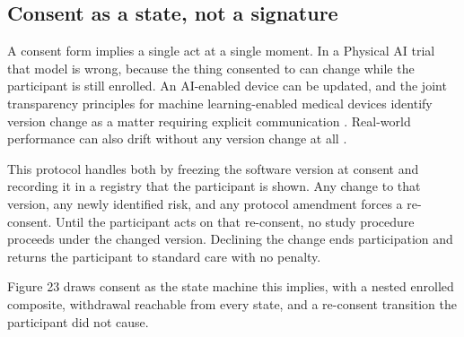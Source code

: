 \subsection{Consent as a state, not a signature}

A consent form implies a single act at a single moment. In a Physical AI trial
that model is wrong, because the thing consented to can change while the
participant is still enrolled. An AI-enabled device can be updated, and the
joint transparency principles for machine learning-enabled medical devices
identify version change as a matter requiring explicit communication
\cite{FDATrans2024}. Real-world performance can also drift without any version
change at all \cite{FDARealW2025}.

This protocol handles both by freezing the software version at consent and
recording it in a registry that the participant is shown. Any change to that
version, any newly identified risk, and any protocol amendment forces a
re-consent. Until the participant acts on that re-consent, no study procedure
proceeds under the changed version. Declining the change ends participation and
returns the participant to standard care with no penalty.

Figure 23 draws consent as the state machine this implies, with a nested
enrolled composite, withdrawal reachable from every state, and a re-consent
transition the participant did not cause.

